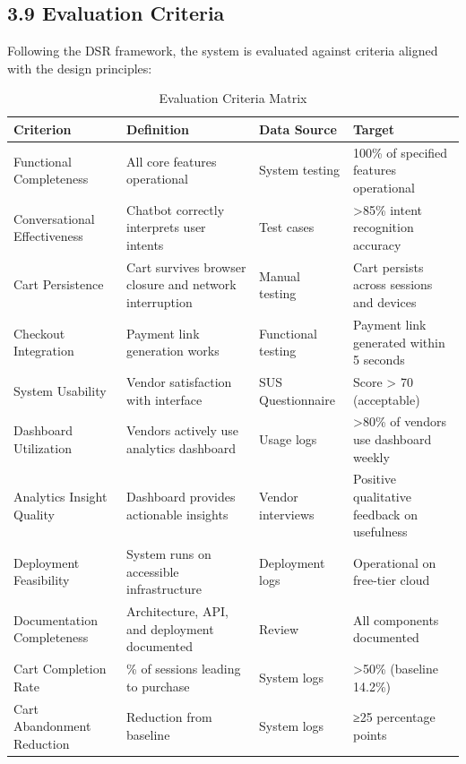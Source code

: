 \documentclass[12pt,a4paper]{article}
\begin{document}
\subsection{3.9 Evaluation Criteria}

Following the DSR framework, the system is evaluated against criteria aligned with the design principles:

\begin{table}[h]
\centering
\caption{Evaluation Criteria Matrix}
\label{tab:evaluation}
\begin{tabular}{p{4cm}p{4cm}p{4cm}p{3cm}}
\toprule
\textbf{Criterion} & \textbf{Definition} & \textbf{Data Source} & \textbf{Target} \\
\midrule
Functional Completeness & All core features operational & System testing & 100\% of specified features operational \\
Conversational Effectiveness & Chatbot correctly interprets user intents & Test cases & >85\% intent recognition accuracy \\
Cart Persistence & Cart survives browser closure and network interruption & Manual testing & Cart persists across sessions and devices \\
Checkout Integration & Payment link generation works & Functional testing & Payment link generated within 5 seconds \\
System Usability & Vendor satisfaction with interface & SUS Questionnaire \citep{brooke1996} & Score > 70 (acceptable) \\
Dashboard Utilization & Vendors actively use analytics dashboard & Usage logs & >80\% of vendors use dashboard weekly \\
Analytics Insight Quality & Dashboard provides actionable insights & Vendor interviews & Positive qualitative feedback on usefulness \\
Deployment Feasibility & System runs on accessible infrastructure & Deployment logs & Operational on free-tier cloud \\
Documentation Completeness & Architecture, API, and deployment documented & Review & All components documented \\
Cart Completion Rate & \% of sessions leading to purchase & System logs & >50\% (baseline 14.2\%) \\
Cart Abandonment Reduction & Reduction from baseline & System logs & ≥25 percentage points \\
\bottomrule
\end{tabular}
\end{table}
\end{document}
